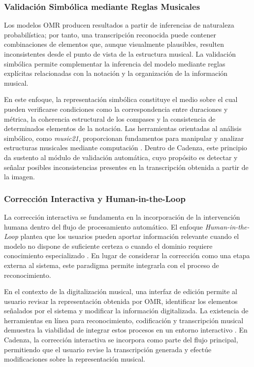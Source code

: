 \documentclass[conference]{IEEEtran}
\begin{document}
\subsubsection{Validación Simbólica mediante Reglas Musicales}

Los modelos OMR producen resultados a partir de inferencias de naturaleza
probabilística; por tanto, una transcripción reconocida puede contener
combinaciones de elementos que, aunque visualmente plausibles, resulten
inconsistentes desde el punto de vista de la estructura musical. La
validación simbólica permite complementar la inferencia del modelo mediante
reglas explícitas relacionadas con la notación y la organización de la
información musical.

En este enfoque, la representación simbólica constituye el medio sobre el
cual pueden verificarse condiciones como la correspondencia entre
duraciones y métrica, la coherencia estructural de los compases y la
consistencia de determinados elementos de la notación. Las herramientas
orientadas al análisis simbólico, como \textit{music21}, proporcionan
fundamentos para manipular y analizar estructuras musicales mediante
computación \cite{cuthbert2010}. Dentro de Cadenza, este principio da
sustento al módulo de validación automática, cuyo propósito es detectar y
señalar posibles inconsistencias presentes en la transcripción obtenida a
partir de la imagen.

\subsubsection{Corrección Interactiva y Human-in-the-Loop}

La corrección interactiva se fundamenta en la incorporación de la
intervención humana dentro del flujo de procesamiento automático. El enfoque
\textit{Human-in-the-Loop} plantea que los usuarios pueden aportar
información relevante cuando el modelo no dispone de suficiente certeza o
cuando el dominio requiere conocimiento especializado
\cite{amershi2014}. En lugar de considerar la corrección como una etapa
externa al sistema, este paradigma permite integrarla con el proceso de
reconocimiento.

En el contexto de la digitalización musical, una interfaz de edición permite
al usuario revisar la representación obtenida por OMR, identificar los
elementos señalados por el sistema y modificar la información digitalizada.
La existencia de herramientas en línea para reconocimiento, codificación y
transcripción musical demuestra la viabilidad de integrar estos procesos en
un entorno interactivo \cite{rizo2023}. En Cadenza, la corrección interactiva
se incorpora como parte del flujo principal, permitiendo que el usuario
revise la transcripción generada y efectúe modificaciones sobre la
representación musical.
\end{document}
